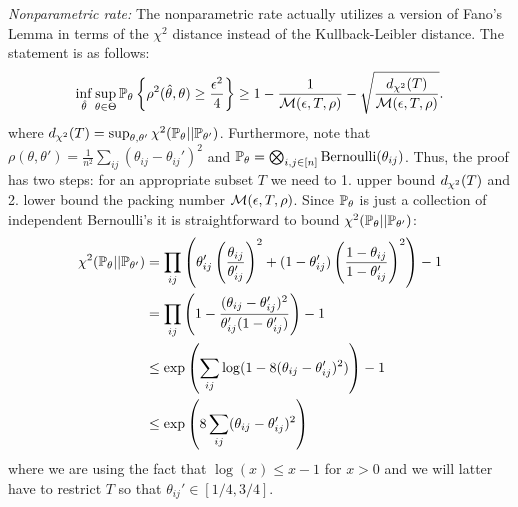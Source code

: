 \documentclass[11pt]{article}
\begin{document}
\textit{Nonparametric rate:} The nonparametric rate actually utilizes a version of Fano's Lemma in terms of the $\chi^2$ distance instead of the Kullback-Leibler distance. The statement is as follows:
\begin{equation}\label{eq:chi2_fano}
\inf_{\hat{\theta}} \sup_{\theta \in \Theta} \mathbb{P}_{\theta} \left\{ \rho^2(\hat{\theta}, \theta)  \geq \frac{\epsilon^2}{4} \right\} \geq 1 - \frac{1}{\mathcal{M}(\epsilon, T, \rho)} - \sqrt{\frac{d_{\chi^2}(T)}{\mathcal{M}(\epsilon, T, \rho)}}.
\end{equation}
where $d_{\chi^2}(T) = \sup_{\theta, \theta'}\chi^2(\mathbb{P}_{\theta} || \mathbb{P}_{\theta'})$. Furthermore, note that $\rho(\theta, \theta') = \frac{1}{n^2} \sum_{ij}(\theta_{ij} - \theta_{ij}')^2$ and $\mathbb{P}_{\theta} = \bigotimes_{i,j \in \lbrack n\rbrack} \operatorname{Bernoulli}(\theta_{ij})$. Thus, the proof has two steps: for an appropriate subset $T$ we need to 1. upper bound $d_{\chi^2}(T)$ and 2. lower bound the packing number $\mathcal{M}(\epsilon, T, \rho)$. Since $\mathbb{P}_{\theta}$ is just a collection of independent Bernoulli's it is straightforward to bound $\chi^2(\mathbb{P}_{\theta} || \mathbb{P}_{\theta'})$:
\begin{align*}
\chi^2(\mathbb{P}_{\theta} || \mathbb{P}_{\theta'}) &= \prod_{ij}\left( \theta_{ij}' \left(\frac{\theta_{ij}}{\theta_{ij}'}\right)^2  +  (1 - \theta_{ij}') \left(\frac{1 - \theta_{ij}}{1 - \theta_{ij}'}\right)^2\right)  - 1 \\
&= \prod_{ij}\left(1 - \frac{(\theta_{ij} - \theta_{ij}')^2}{\theta_{ij}' ( 1- \theta_{ij}')}\right) - 1 \\
&\leq \exp\left(\sum_{ij} \log(1 - 8 (\theta_{ij} - \theta_{ij}')^2)\right) - 1 \\
&\leq \exp\left(8 \sum_{ij} (\theta_{ij} - \theta_{ij}')^2 \right)
\end{align*}
where we are using the fact that $\log(x) \leq x - 1$ for $x > 0$ and we will latter have to restrict $T$ so that $\theta_{ij}' \in [1/4, 3/4]$.
\end{document}
